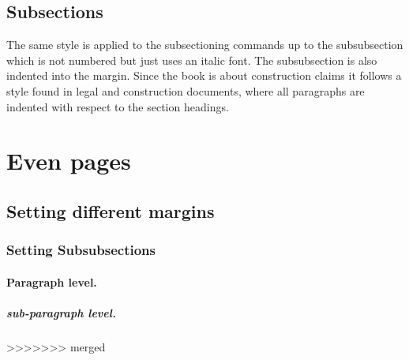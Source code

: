 \subsection{Subsections}
The same style is applied to the subsectioning commands up to the subsubsection which is not numbered but just uses an italic font. The subsubsection is also indented into the margin. Since the book is about construction claims it follows a style found in legal and construction documents, where all paragraphs are indented with respect to the section headings.
\lipsum[1-2]
\section{Even pages}
\lipsum[2]
\subsection{Setting different margins}
\lipsum[1]
\subsubsection{Setting Subsubsections}
\lipsum[1]
\paragraph{Paragraph level. } \lipsum*[3]\par

\lipsum[1]
\subparagraph{sub-paragraph level. } \lipsum*[3]\par


\restoregeometry
>>>>>>> merged
